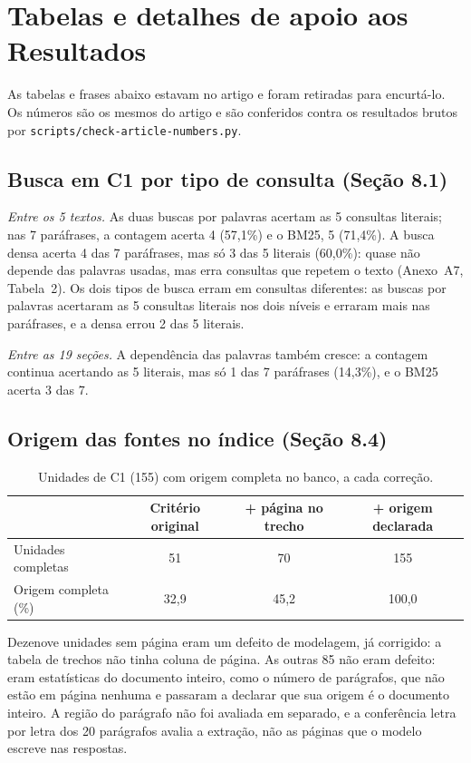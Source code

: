\documentclass[12pt]{article}
\begin{document}
\section*{Tabelas e detalhes de apoio aos Resultados}

As tabelas e frases abaixo estavam no artigo e foram retiradas para encurtá-lo. Os números são os mesmos do artigo e são conferidos contra os resultados brutos por \texttt{scripts/check-article-numbers.py}.

\subsection*{Busca em C1 por tipo de consulta (Seção 8.1)}

\textit{Entre os 5 textos.} As duas buscas por palavras acertam as 5 consultas literais; nas 7 paráfrases, a contagem acerta 4 (57,1\%) e o BM25, 5 (71,4\%). A busca densa acerta 4 das 7 paráfrases, mas só 3 das 5 literais (60,0\%): quase não depende das palavras usadas, mas erra consultas que repetem o texto (Anexo~A7, Tabela~2). Os dois tipos de busca erram em consultas diferentes: as buscas por palavras acertaram as 5 consultas literais nos dois níveis e erraram mais nas paráfrases, e a densa errou 2 das 5 literais.

\textit{Entre as 19 seções.} A dependência das palavras também cresce: a contagem continua acertando as 5 literais, mas só 1 das 7 paráfrases (14,3\%), e o BM25 acerta 3 das 7.

\subsection*{Origem das fontes no índice (Seção 8.4)}

\begin{table}[!htbp]
\centering
\caption{Unidades de C1 (155) com origem completa no banco, a cada correção.}
\label{apoio:provenance-evolucao}
\begin{tabular}{lccc}
\toprule
 & Critério original & + página no trecho & + origem declarada \\
\midrule
Unidades completas & 51 & 70 & 155 \\
Origem completa (\%) & 32,9 & 45,2 & 100,0 \\
\bottomrule
\end{tabular}
\end{table}

Dezenove unidades sem página eram um defeito de modelagem, já corrigido: a tabela de trechos não tinha coluna de página. As outras 85 não eram defeito: eram estatísticas do documento inteiro, como o número de parágrafos, que não estão em página nenhuma e passaram a declarar que sua origem é o documento inteiro. A região do parágrafo não foi avaliada em separado, e a conferência letra por letra dos 20 parágrafos avalia a extração, não as páginas que o modelo escreve nas respostas.
\end{document}

